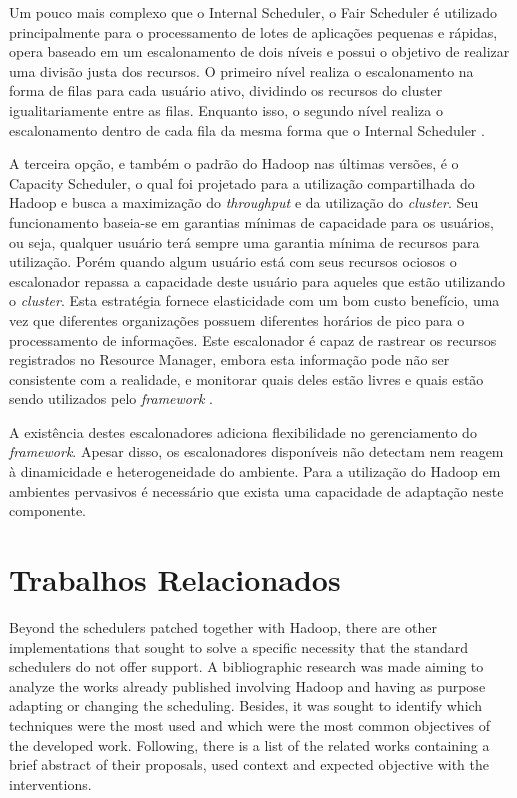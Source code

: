 Um pouco mais complexo que o Internal Scheduler, o Fair Scheduler é utilizado principalmente para o processamento de lotes de aplicações pequenas e rápidas, opera baseado em um escalonamento de dois níveis e possui o objetivo de realizar uma divisão justa dos recursos. O primeiro nível realiza o escalonamento na forma de filas para cada usuário ativo, dividindo os recursos do cluster igualitariamente entre as filas. Enquanto isso, o segundo nível realiza o escalonamento dentro de cada fila da mesma forma que o Internal Scheduler \cite{FairScheduler}. 

A terceira opção, e também o padrão do Hadoop nas últimas versões, é o Capacity Scheduler, o qual foi projetado para a utilização compartilhada do Hadoop e busca a maximização do \textit{throughput} e da utilização do \textit{cluster}. Seu funcionamento baseia-se em garantias mínimas de capacidade para os usuários, ou seja, qualquer usuário terá sempre uma garantia mínima de recursos para utilização. Porém quando algum usuário está com seus recursos ociosos o escalonador repassa a capacidade deste usuário  para aqueles que estão utilizando o \textit{cluster}. Esta estratégia fornece elasticidade com um bom custo benefício, uma vez que diferentes organizações possuem diferentes horários de pico para o processamento de informações. Este escalonador é capaz de rastrear os recursos registrados no Resource Manager, embora esta informação pode não ser consistente com a realidade, e monitorar quais deles estão livres e quais estão sendo utilizados pelo \textit{framework} \cite{CapacityScheduler}.

A existência destes escalonadores adiciona flexibilidade no gerenciamento do \textit{framework}. Apesar disso, os escalonadores disponíveis não detectam nem reagem à dinamicidade e heterogeneidade do ambiente. Para a utilização do Hadoop em ambientes pervasivos é necessário que exista uma capacidade de adaptação neste componente.



\section{Trabalhos Relacionados}
Beyond the schedulers patched together with Hadoop, there are other implementations that sought to solve a specific necessity that the standard schedulers do not offer support. A bibliographic research was made aiming to analyze the works already published involving Hadoop and having as purpose adapting or changing the scheduling. Besides, it was sought to identify which techniques were the most used and which were the most common objectives of the developed work. Following, there is a list of the related works containing a brief abstract of their proposals, used context and expected objective with the interventions.

